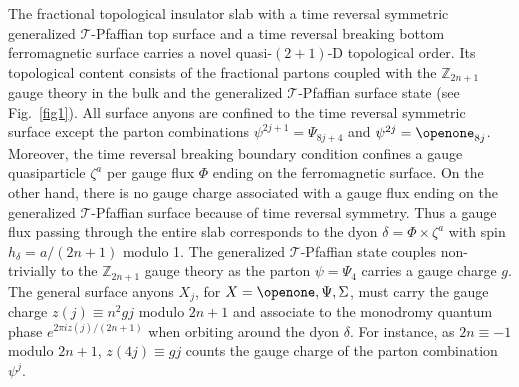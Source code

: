 The fractional topological insulator slab with a time reversal symmetric generalized $\mathcal{T}$-Pfaffian top surface and a time reversal breaking bottom ferromagnetic surface carries a novel quasi-$(2+1)$-D topological order. Its topological content consists of the fractional partons coupled with the $\mathbb{Z}_{2n+1}$ gauge theory in the bulk and the generalized $\mathcal{T}$-Pfaffian surface state (see Fig.~\ref{fig1}). All surface anyons are confined to the time reversal symmetric surface except the parton combinations $\psi^{2j+1}=\Psi_{8j+4}$ and $\psi^{2j}=\openone_{8j}$. Moreover, the time reversal breaking boundary condition confines a gauge quasiparticle $\zeta^a$ per gauge flux $\Phi$ ending on the ferromagnetic surface. On the other hand, there is no gauge charge associated with a gauge flux ending on the generalized $\mathcal{T}$-Pfaffian surface because of time reversal symmetry. Thus a gauge flux passing through the entire slab corresponds to the dyon $\delta=\Phi\times\zeta^a$ with spin $h_\delta=a/(2n+1)$ modulo 1. The generalized $\mathcal{T}$-Pfaffian state couples non-trivially to the $\mathbb{Z}_{2n+1}$ gauge theory as the parton $\psi=\Psi_4$ carries a gauge charge $g$. The general surface anyons $X_j$, for $X=\openone,\Psi,\Sigma$, must carry the gauge charge $z(j)\equiv n^2gj$ modulo $2n+1$ and associate to the monodromy quantum phase $e^{2\pi iz(j)/(2n+1)}$ when orbiting around the dyon $\delta$. For instance, as $2n\equiv-1$ modulo $2n+1$, $z(4j)\equiv gj$ counts the gauge charge of the parton combination $\psi^j$.

